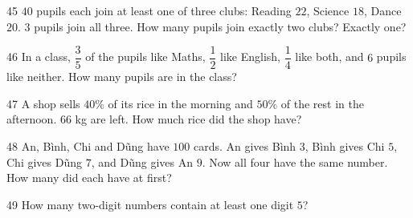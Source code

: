 \gap
\begin{probbox}{45}{}
$40$ pupils each join at least one of three clubs: Reading $22$, Science $18$, Dance $20$. $3$ pupils join all three. How many pupils join exactly two clubs? Exactly one?
\end{probbox}
\gap
\begin{probbox}{46}{}
In a class, $\dfrac35$ of the pupils like Maths, $\dfrac12$ like English, $\dfrac14$ like both, and $6$ pupils like neither. How many pupils are in the class?
\end{probbox}
\gap
\begin{probbox}{47}{}
A shop sells $40\%$ of its rice in the morning and $50\%$ of the rest in the afternoon. $66$ kg are left. How much rice did the shop have?
\end{probbox}
\gap
\begin{probbox}{48}{}
An, Bình, Chi and Dũng have $100$ cards. An gives Bình $3$, Bình gives Chi $5$, Chi gives Dũng $7$, and Dũng gives An $9$. Now all four have the same number. How many did each have at first?
\end{probbox}
\gap
\begin{probbox}{49}{}
How many two-digit numbers contain at least one digit $5$?
\end{probbox}
